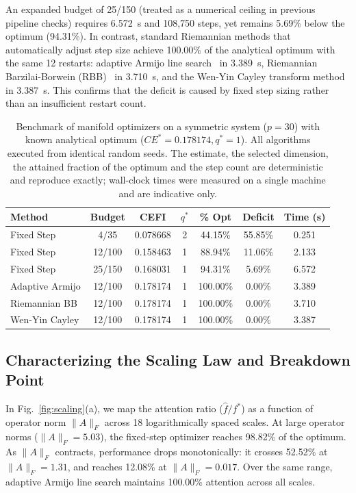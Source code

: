 \documentclass[preprint,12pt]{elsarticle}
\begin{document}
An expanded budget of 25/150 (treated as a numerical ceiling in previous pipeline checks) requires 6.572~s and 108,750 steps, yet remains 5.69\% below the optimum (94.31\%). In contrast, standard Riemannian methods that automatically adjust step size achieve 100.00\% of the analytical optimum with the same 12 restarts: adaptive Armijo line search~\cite{Boumal2019} in 3.389~s, Riemannian Barzilai-Borwein (RBB)~\cite{Iannazzo2018} in 3.710~s, and the Wen-Yin Cayley transform method~\cite{WenYin2013} in 3.387~s. This confirms that the deficit is caused by fixed step sizing rather than an insufficient restart count.

\begin{table}[!ht]
\caption{Benchmark of manifold optimizers on a symmetric system ($p=30$) with known analytical optimum ($CE^* = 0.178174, q^* = 1$). All algorithms executed from identical random seeds. The estimate, the selected dimension, the attained fraction of the optimum and the step count are deterministic and reproduce exactly; wall-clock times were measured on a single machine and are indicative only.}
\label{tab:benchmarks}

\footnotesize
\setlength{\tabcolsep}{2pt}
\begin{tabular*}{\linewidth}{@{\extracolsep{\fill}}lcccccc@{}}
\toprule
Method & Budget & CEFI & $q^*$ & \% Opt & Deficit & Time (s) \\
\midrule
Fixed Step & 4/35 & 0.078668 & 2 & 44.15\% & 55.85\% & 0.251 \\
Fixed Step & 12/100 & 0.158463 & 1 & 88.94\% & 11.06\% & 2.133 \\
Fixed Step & 25/150 & 0.168031 & 1 & 94.31\% & 5.69\% & 6.572 \\
Adaptive Armijo & 12/100 & 0.178174 & 1 & 100.00\% & 0.00\% & 3.389 \\
Riemannian BB & 12/100 & 0.178174 & 1 & 100.00\% & 0.00\% & 3.710 \\
Wen-Yin Cayley & 12/100 & 0.178174 & 1 & 100.00\% & 0.00\% & 3.387 \\
\bottomrule
\end{tabular*}

\end{table}

\subsection{Characterizing the Scaling Law and Breakdown Point}

In Fig.~\ref{fig:scaling}(a), we map the attention ratio ($\hat{f} / f^*$) as a function of operator norm $\|A\|_F$ across 18 logarithmically spaced scales. At large operator norms ($\|A\|_F = 5.03$), the fixed-step optimizer reaches 98.82\% of the optimum. As $\|A\|_F$ contracts, performance drops monotonically: it crosses 52.52\% at $\|A\|_F = 1.31$, and reaches 12.08\% at $\|A\|_F = 0.017$. Over the same range, adaptive Armijo line search maintains 100.00\% attention across all scales.
\end{document}
